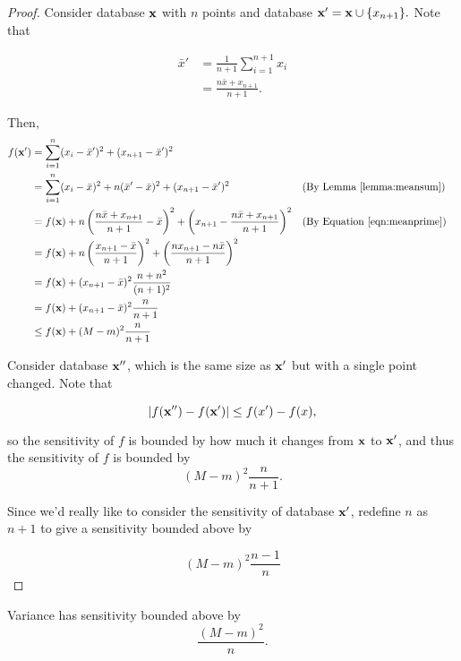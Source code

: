 \documentclass[11pt, oneside]{article}   	%
\begin{document}
\begin{proof}
Consider database $\textbf{x}$ with $n$ points and database $\textbf{x}' = \textbf{x} \cup \{x_{n+1}\}.$ Note that

\begin{align}
\label{eqn:meanprime}
\bar{x}' &= \frac{1}{n+1} \sum_{i=1}^{n+1} x_i \nonumber \\
	&= \frac{n\bar{x} + x_{n+1}}{n+1}.
\end{align}

Then,
\begin{align*}
f(\textbf{x}') &= \sum_{i=1}^n (x_i - \bar{x}')^2 + (x_{n+1} - \bar{x}')^2\\
	&= \sum_{i=1}^n (x_i - \bar{x})^2 + n(\bar{x}'-\bar{x})^2 + (x_{n+1} - \bar{x}')^2 &&\text{(By Lemma \ref{lemma:meansum})}\\
	&= f(\textbf{x}) + n\left( \frac{n\bar{x} + x_{n+1}}{n+1}-\bar{x}\right)^2 + \left(x_{n+1} - \frac{n\bar{x} + x_{n+1}}{n+1} \right)^2 &&\text{(By Equation \ref{eqn:meanprime})}\\
	&= f(\textbf{x}) + n\left(\frac{x_{n+1}-\bar{x}}{n+1}\right)^2 + \left( \frac{nx_{n+1}-n\bar{x}}{n+1}\right)^2\\
	&= f(\textbf{x}) + (x_{n+1}-\bar{x})^2 \frac{n+n^2}{(n+1)^2}\\
	&= f(\textbf{x}) + (x_{n+1}-\bar{x})^2 \frac{n}{n+1}\\
	&\le f(\textbf{x}) + (M-m)^2 \frac{n}{n+1}
\end{align*}

Consider database $\textbf{x}''$, which is the same size as $\textbf{x}'$ but with a single point changed. Note that

$$ \lvert f(\textbf{x}'') - f(\textbf{x}') \rvert \le f(x')-f(x),$$

so the sensitivity of $f$ is bounded by how much it changes from $\textbf{x}$ to $\textbf{x}'$, and thus the sensitivity of $f$ is bounded by 
$$ (M-m)^2 \frac{n}{n+1}.$$

Since we'd really like to consider the sensitivity of database $\textbf{x}'$, redefine $n$ as $n+1$ to give a sensitivity bounded above by 

$$ (M-m)^2 \frac{n-1}{n}$$
\end{proof}

\begin{corollary}
Variance has sensitivity bounded above by 
$$ \frac{(M-m)^2 }{n}.$$
\end{corollary}
\end{document}
